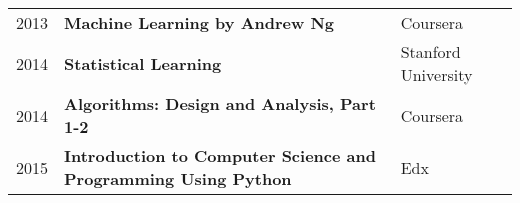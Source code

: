 \documentclass[a4paper, oneside, final]{scrartcl}
\begin{document}
\begin{center}
\begin{tabular}{cp{11cm}p{1cm}}
2013 & \textbf{Machine Learning by Andrew Ng} & Coursera  \\
2014 & \textbf{Statistical Learning} & Stanford University  \\
2014 & \textbf{Algorithms: Design and Analysis, Part 1-2} & Coursera  \\
2015 & \textbf{Introduction to Computer Science and Programming Using Python} & Edx  \\
\end{tabular}


\end{center}
\end{document}
